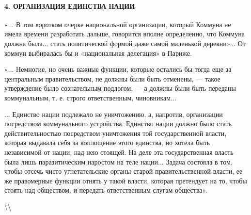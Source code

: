 \documentclass[12pt]{article}
\newcommand\ellipsis{%
  \textbackslash\thinspace\textellipsis\textbackslash
}
\newcommand{\parnum}{(\arabic{parcount})}
\newcounter{parcount}
\newenvironment{parnumbers}{%
  \par%
  \everypar{\noindent \stepcounter{parcount}\marginpar[]{\parnum}}%
}{}
\begin{document}
\paragraph{4. ОРГАНИЗАЦИЯ ЕДИНСТВА НАЦИИ}
\begin{parnumbers}
«... В том коротком очерке национальной организации, который Коммуна не имела времени разработать дальше, говорится вполне определенно, что Коммуна должна была... стать политической формой даже самой маленькой деревни»... От коммун выбиралась бы и «национальная делегация» в Париже.

«... Немногие, но очень важные функции, которые остались бы тогда еще за центральным правительством, не должны были быть отменены, — такое утверждение было сознательным подлогом, — а должны были быть переданы коммунальным, т. е. строго ответственным, чиновникам...

... Единство нации подлежало не уничтожению, а, напротив, организации посредством коммунального устройства. Единство нации должно было стать действительностью посредством уничтожения той государственной власти, которая выдавала себя за воплощение этого единства, но хотела быть независимой от нации, над нею стоящей. На деле эта государственная власть была лишь паразитическим наростом на теле нации... Задача состояла в том, чтобы отсечь чисто угнетательские органы старой правительственной власти, ее же правомерные функции отнять у такой власти, которая претендует на то, чтобы стоять над обществом, и передать ответственным слугам общества».
\end{parnumbers}

\ellipsis
\end{document}
